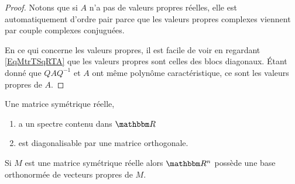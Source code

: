 \begin{proof}
    Notons que si \( A\) n'a pas de valeurs propres réelles, elle est automatiquement d'ordre pair parce que les valeurs propres complexes viennent par couple complexes conjuguées.

    En ce qui concerne les valeurs propres, il est facile de voir en regardant \eqref{EqMtrTSqRTA} que les valeurs propres sont celles des blocs diagonaux. Étant donné que \( QAQ^{-1}\) et \( A\) ont même polynôme caractéristique, ce sont les valeurs propres de \( A\).
\end{proof}

\begin{theorem} \label{ThoeTMXla}
    Une matrice symétrique réelle,
    \begin{enumerate}
        \item       \label{ITEMooJWHLooSfhNSW}
            a un spectre contenu dans \( \eR\)
        \item       \label{ITEMooMWWRooXxGONW}
            est diagonalisable par une matrice orthogonale.
    \end{enumerate}
    Si \( M\) est une matrice symétrique réelle alors \( \eR^n\) possède une base orthonormée de vecteurs propres de \( M\).
\end{theorem}

